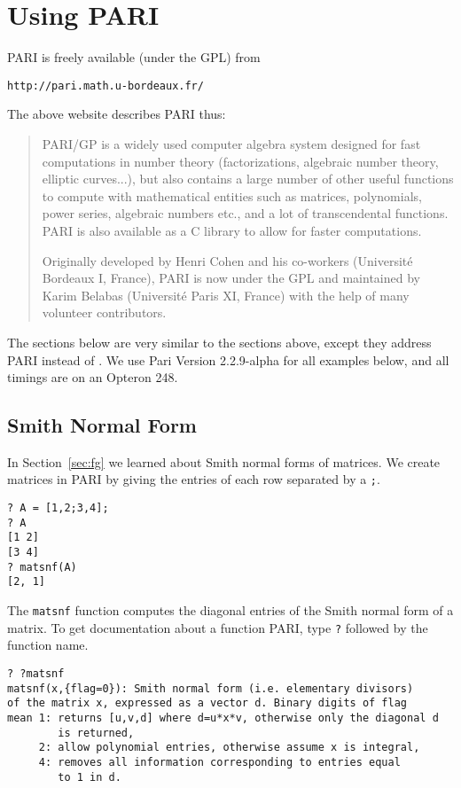 
\section{Using PARI}

PARI is freely available (under the GPL) from
\begin{center}
\verb|http://pari.math.u-bordeaux.fr/|
\end{center}
The above website describes PARI thus:
\begin{quote}
  PARI/GP is a widely used computer algebra system designed for fast
  computations in number theory (factorizations, algebraic number
  theory, elliptic curves...), but also contains a large number of
  other useful functions to compute with mathematical entities such as
  matrices, polynomials, power series, algebraic numbers etc., and a
  lot of transcendental functions. PARI is also available as a C
  library to allow for faster computations.

  Originally developed by Henri Cohen and his co-workers (Université
  Bordeaux I, France), PARI is now under the GPL and maintained by
  Karim Belabas (Université Paris XI, France) with the help of many
  volunteer contributors.
\end{quote}

The sections below are very similar to the \magma{} sections
above, except they address PARI instead of \magma{}.  We use
Pari Version 2.2.9-alpha for all examples below, and all timings
are on an Opteron 248.

\subsection{Smith Normal Form}
In Section~\ref{sec:fg} we learned about Smith normal forms
of matrices.   We create matrices in PARI by giving the
entries of each  row separated by a {\tt ;}.
\begin{verbatim}
? A = [1,2;3,4];
? A
[1 2]
[3 4]
? matsnf(A)
[2, 1]
\end{verbatim}
The {\tt matsnf} function computes the diagonal entries of the
Smith normal form of a matrix.  To get documentation about
a function PARI, type {\tt ?} followed by the function name.
\begin{verbatim}
? ?matsnf
matsnf(x,{flag=0}): Smith normal form (i.e. elementary divisors) 
of the matrix x, expressed as a vector d. Binary digits of flag 
mean 1: returns [u,v,d] where d=u*x*v, otherwise only the diagonal d 
        is returned, 
     2: allow polynomial entries, otherwise assume x is integral, 
     4: removes all information corresponding to entries equal 
        to 1 in d.
\end{verbatim}

